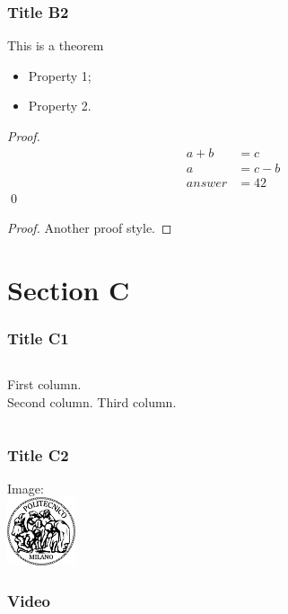 \documentclass[c]{beamer}
\begin{document}

\begin{frame}
\frametitle{Title B2}

\begin{theorem}[Th. Name]
\label{thlabel} This is a theorem
\begin{itemize}
\item Property 1;
\item Property 2.
\end{itemize}
\end{theorem}

\pause

\textit{Proof. }
\begin{align}
    a + b & = c \\
    a & = c - b \\
    answer & = 42
\end{align}
\qed

\pause

\begin{proof}
Another proof style.
\end{proof}

\end{frame}

\section{Section C}

\begin{frame}
\frametitle{Title C1}

\begin{columns}[t, onlytextwidth]
First column.\\
\pause{}
Second column.
\pause
{}
Third column.
\end{columns}

\end{frame}


\begin{frame}
\frametitle{Title C2}


\centering
Image:\\
\bigskip\bigskip
\includegraphics[height=2cm]{gfx/logo-polimi}

\end{frame}


\begin{frame}
\frametitle{Video}

\end{frame}
\end{document}
